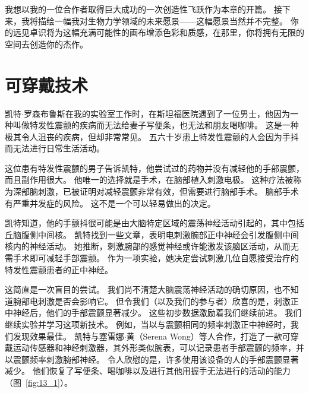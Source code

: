 我想以我的一位合作者取得巨大成功的一次创造性飞跃作为本章的开篇。
接下来，我将描绘一幅我对生物力学领域的未来愿景——这幅愿景当然并不完整。
你的远见卓识将为这幅充满可能性的画布增添色彩和质感，在那里，你将拥有无限的空间去创造你的杰作。


\section{可穿戴技术}

凯特$\cdot$罗森布鲁斯在我的实验室工作时，在斯坦福医院遇到了一位男士，他因为一种叫做特发性震颤的疾病而无法给妻子写便条，也无法和朋友喝咖啡。
这是一种极其令人沮丧的疾病，但却非常常见。
五六十岁患上特发性震颤的人会因为手抖而无法进行日常生活活动。


这位患有特发性震颤的男子告诉凯特，他尝试过的药物并没有减轻他的手部震颤，而且副作用很大。
他唯一的选择就是手术，在脑部植入刺激电极。
这种疗法被称为深部脑刺激，已被证明对减轻震颤非常有效，但需要进行脑部手术。
脑部手术有严重并发症的风险。
这不是一个可以轻易做出的决定。


凯特知道，他的手颤抖很可能是由大脑特定区域的震荡神经活动引起的，其中包括丘脑腹侧中间核。
凯特找到一些文章，表明电刺激腕部正中神经会引发腹侧中间核内的神经活动。
她推断，刺激腕部的感觉神经或许能激发该脑区活动，从而无需手术即可减轻手部震颤。
作为一项实验，她决定尝试刺激几位自愿接受治疗的特发性震颤患者的正中神经。


这简直是​​一次盲目的尝试。
我们尚不清楚大脑震荡神经活动的确切原因，也不知道腕部电刺激是否会影响它。
但令我们（以及我们的参与者）欣喜的是，刺激正中神经后，他们的手部震颤显著减少。
这些初步数据激励着我们继续前进。
我们继续实验并学习这项新技术。
例如，当以与震颤相同的频率刺激正中神经时，我们发现效果最佳。
凯特与塞雷娜$\cdot$黄（Serena Wong）等人合作，打造了一款可穿戴运动传感器和神经刺激器，其外形类似腕表，可以记录患者手部震颤的频率，并以震颤频率刺激腕部神经。
令人欣慰的是，许多使用该设备的人的手部震颤显著减少\cite{lin2018noninvasive}。
他们恢复了写便条、喝咖啡以及进行其他用握手无法进行的活动的能力（图~\ref{fig:13_1}）。


